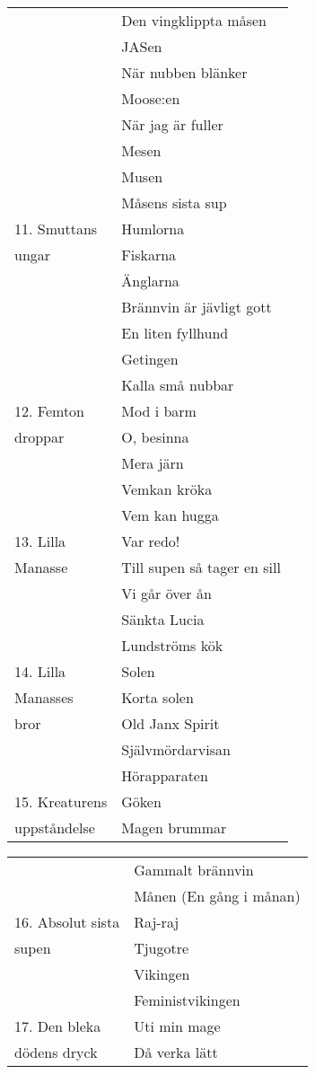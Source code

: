\documentclass[a6paper,10pt]{article}
\begin{document}
\begin{table}[!ht]
\begin{tabularx}{1\textwidth}{l X}
&Den vingklippta måsen\\
&JASen\\
&När nubben blänker\\
&Moose:en\\
&När jag är fuller\\
&Mesen\\
&Musen\\
&Måsens sista sup\\
11. Smuttans&Humlorna\\
\hspace{17pt}ungar&Fiskarna\\
&Änglarna\\
&Brännvin är jävligt gott\\
&En liten fyllhund\\
&Getingen\\
&Kalla små nubbar\\
12. Femton&Mod i barm\\
\hspace{17pt}droppar&O, besinna\\
&Mera järn\\
&Vemkan kröka\\
&Vem kan hugga\\
13. Lilla&Var redo!\\
\hspace{17pt}Manasse&Till supen så tager en sill\\
&Vi går över ån\\
&Sänkta Lucia\\
&Lundströms kök\\
14. Lilla&Solen\\
\hspace{17pt}Manasses&Korta solen\\
\hspace{17pt}bror&Old Janx Spirit\\
&Självmördarvisan\\
&Hörapparaten\\
15. Kreaturens&Göken\\
\hspace{17pt}uppståndelse&Magen brummar
\end{tabularx}
\end{table}
\newpage
\begin{table}[!ht]
\begin{tabularx}{1\textwidth}{l X}
&Gammalt brännvin\\
&Månen (En gång i månan)\\
16. Absolut sista&Raj-raj\\
\hspace{17pt}supen&Tjugotre\\
&Vikingen\\
&Feministvikingen\\
17. Den bleka&Uti min mage\\
\hspace{17pt}dödens dryck&Då verka lätt
\end{tabularx}
\end{table}
\end{document}
